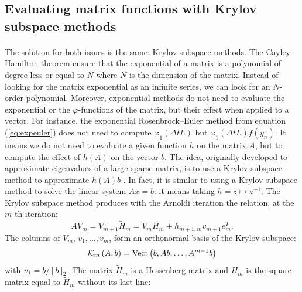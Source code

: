     \subsection{Evaluating matrix functions with Krylov subspace methods}

      \paragraph{}
      The solution for both issues is the same: Krylov subspace methods.
      The Cayley--Hamilton theorem ensure that the exponential of a matrix is a polynomial of degree less or equal to $N$ where $N$ is the dimension of the matrix.
      Instead of looking for the matrix exponential as an infinite series, we can look for an $N$-order polynomial.
      Moreover, exponential methods do not need to evaluate the exponential or the $\varphi$-functions of the matrix, but their effect when applied to a vector.
      For instance, the exponential Rosenbrock--Euler method from equation (\ref{eq:expeuler}) does not need to compute $\varphi_1\left(\Delta t L\right)$ but $\varphi_1\left(\Delta t L\right)f\left(y_n\right)$.
      It means we do not need to evaluate a given function $h$ on the matrix $A$, but to compute the effect of $h\left(A\right)$ on the vector $b$.
      The idea, originally developed to approximate eigenvalues of a large sparse matrix, is to use a Krylov subspace method to approximate $h\left(A\right)b$ \cite{Saad1992, Sidje1998}.
      In fact, it is similar to using a Krylov subspace method to solve the linear system $Ax = b$: it means taking $h = z \mapsto z^{-1}$.
      The Krylov subspace method produces with the Arnoldi iteration the relation, at the $m$-th iteration:
      \begin{equation}\label{eq:arnoldi}
        AV_m = V_{m+1} \tilde{H}_m = V_m H_m + h_{m+1, m} v_{m+1} e_m^T .
      \end{equation}
      The columns of $V_m$, $v_1, \dots, v_m$, form an orthonormal basis of the Krylov subspace:
      \begin{equation}
        \krylov[A, b]{m} = \operatorname{Vect}\left( b, Ab, \dots, A^{m-1}b \right)
      \end{equation}
      with $v_1 = b / \norm[2]{b}$.
      The matrix $\tilde{H}_m$ is a Hessenberg matrix and $H_m$ is the square matrix equal to $\tilde{H}_m$ without its last line:
